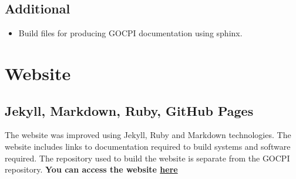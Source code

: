 \documentclass[12pt]{article}
\begin{document}
\subsection{Additional}
\begin{itemize}
	\item Build files for producing GOCPI documentation using sphinx.
\end{itemize}
\newpage
\section{Website}
\subsection{Jekyll, Markdown, Ruby, GitHub Pages}
The website was improved using Jekyll, Ruby and Markdown technologies.
The website includes links to documentation required to build systems and software required.
The repository used to build the website is separate from the GOCPI repository.
\textbf{You can access the website \href{https://connormcdowall.com/gocpi.html}{here}}
\end{document}

